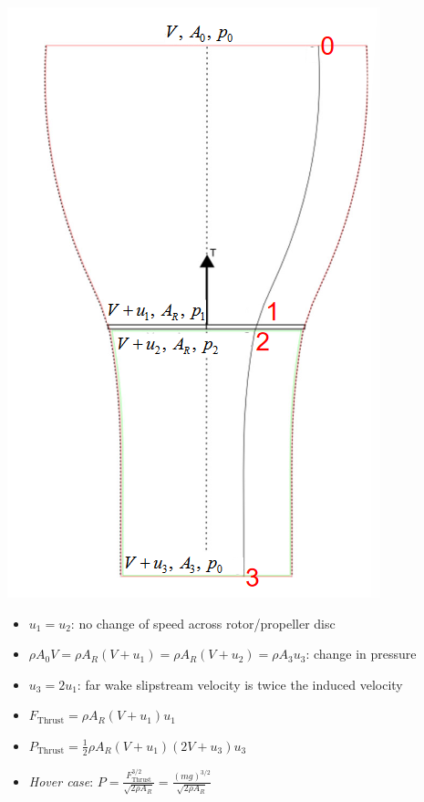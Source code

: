 \documentclass[landscape,a0paper,fontscale=0.285]{baposter} %
\newcommand{\compresslist}{ %
\setlength{\itemsep}{1pt}
\setlength{\parskip}{0pt}
\setlength{\parsep}{0pt}
}
\begin{document}
\begin{poster}
{\colorbox[HTML]{CCFFFF}{}
\begin{minipage}[c]{0.275\textwidth}
    \includegraphics[width=\textwidth]{images/propeller.png}
\end{minipage}
\hfill
\begin{minipage}[c]{0.7\textwidth}
    \begin{itemize}\compresslist
    \item $u_1 = u_2$: no change of speed across rotor/propeller disc
    \item $\rho A_0 V = \rho A_R(V + u_1) = \rho A_R(V + u_2) = \rho A_3 u_3$: change in pressure
    \item $u_3 = 2u_1$: far wake slipstream velocity is twice the induced velocity
    \item $F_{\text{Thrust}} = \rho A_R(V + u_1)u_1$
    \item $P_{\text{Thrust}}\!=\!\frac{1}{2}\rho A_R(V\!+\!u_1)(2V\!+\!u_3) u_3$
    \item \textit{Hover case}: $P = \frac{F^{3/2}_{\text{Thrust}}}{\sqrt{2\rho A_R}} = \frac{(mg)^{3/2}}{\sqrt{2\rho A_R}}$
\end{itemize}
\end{minipage}



}
\end{poster}
\end{document}
